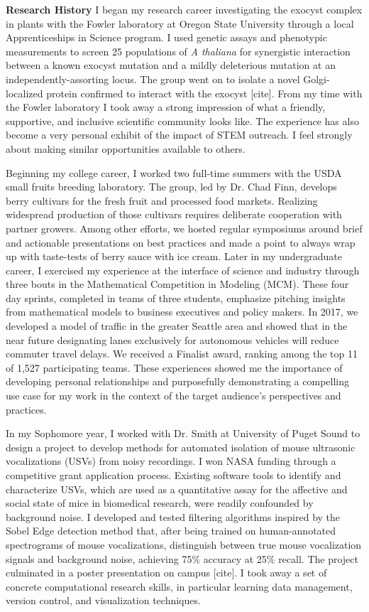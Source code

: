 \textbf{Research History}
I began my research career investigating the exocyst complex in plants with the Fowler laboratory at Oregon State University through a local Apprenticeships in Science program.
I used genetic assays and phenotypic measurements to screen 25 populations of \textit{A thaliana} for synergistic interaction between a known exocyst mutation and a mildly deleterious mutation at an independently-assorting locus.
The group went on to isolate a novel Golgi-localized protein confirmed to interact with the exocyst [cite].
From my time with the Fowler laboratory I took away a strong impression of what a friendly, supportive, and inclusive scientific community looks like.
The experience has also become a very personal exhibit of the impact of STEM outreach.
I feel strongly about making similar opportunities available to others.

Beginning my college career, I worked two full-time summers with the USDA small fruits breeding laboratory.
The group, led by Dr. Chad Finn, develops berry cultivars for the fresh fruit and processed food markets.
Realizing widespread production of those cultivars requires deliberate cooperation with partner growers.
Among other efforts, we hosted regular symposiums around brief and actionable presentations on best practices and made a point to always wrap up with taste-tests of berry sauce with ice cream.
Later in my undergraduate career, I exercised my experience at the interface of science and industry through three bouts in the Mathematical Competition in Modeling (MCM).
These four day sprints, completed in teams of three students, emphasize pitching insights from mathematical models to business executives and policy makers.
In 2017, we developed a model of traffic in the greater Seattle area and showed that in the near future designating lanes exclusively for autonomous vehicles will reduce commuter travel delays.
We received a Finalist award, ranking among the top 11 of 1,527 participating teams.
These experiences showed me the importance of developing personal relationships and purposefully demonstrating a compelling use case for my work in the context of the target audience's perspectives and practices.

In my Sophomore year, I worked with Dr. Smith at University of Puget Sound to design a project to develop methods for automated isolation of mouse
ultrasonic vocalizations (USVs) from noisy recordings.
I won NASA funding through a competitive grant application process.
Existing software tools to identify and characterize USVs, which are used as a quantitative assay for the affective and social state of mice in biomedical research, were readily confounded by background noise.
I developed and tested filtering algorithms inspired by the Sobel Edge detection method that, after being trained on human-annotated spectrograms of mouse vocalizations, distinguish between true mouse vocalization signals and background noise, achieving 75\% accuracy at 25\% recall.
The project culminated in a poster presentation on campus [cite].
I took away a set of concrete computational research skills, in particular learning data management, version control, and visualization techniques.

